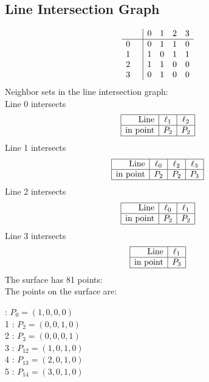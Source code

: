 \documentclass{article}
\begin{document}
{\subsection*{Line Intersection Graph}
{\arraycolsep=1pt
$$
\begin{array}{rr|*{4}r}
 &  & 0 & 1 & 2 & 3\\
\hline
0 &  & 0 & 1 & 1 & 0\\
1 &  & 1 & 0 & 1 & 1\\
2 &  & 1 & 1 & 0 & 0\\
3 &  & 0 & 1 & 0 & 0\\
\end{array}
$$
}%
Neighbor sets in the line intersection graph:\\
Line 0 intersects 
$$
\begin{array}{|r*{2}{|c}|}
\hline
\mbox{Line}  & \ell_{1} & \ell_{2}\\
\hline
\mbox{in point}  & P_{2} & P_{2}\\
\hline
\end{array}
$$
Line 1 intersects 
$$
\begin{array}{|r*{3}{|c}|}
\hline
\mbox{Line}  & \ell_{0} & \ell_{2} & \ell_{3}\\
\hline
\mbox{in point}  & P_{2} & P_{2} & P_{3}\\
\hline
\end{array}
$$
Line 2 intersects 
$$
\begin{array}{|r*{2}{|c}|}
\hline
\mbox{Line}  & \ell_{0} & \ell_{1}\\
\hline
\mbox{in point}  & P_{2} & P_{2}\\
\hline
\end{array}
$$
Line 3 intersects 
$$
\begin{array}{|r*{1}{|c}|}
\hline
\mbox{Line}  & \ell_{1}\\
\hline
\mbox{in point}  & P_{3}\\
\hline
\end{array}
$$
The surface has 81 points:\\
The points on the surface are:\\
\begin{multicols}{3}
 : $P_{0}=( 1, 0, 0, 0 )$\\
1 : $P_{2}=( 0, 0, 1, 0 )$\\
2 : $P_{3}=( 0, 0, 0, 1 )$\\
3 : $P_{12}=( 1, 0, 1, 0 )$\\
4 : $P_{13}=( 2, 0, 1, 0 )$\\
5 : $P_{14}=( 3, 0, 1, 0 )$\\

\end{multicols}}
\end{document}
